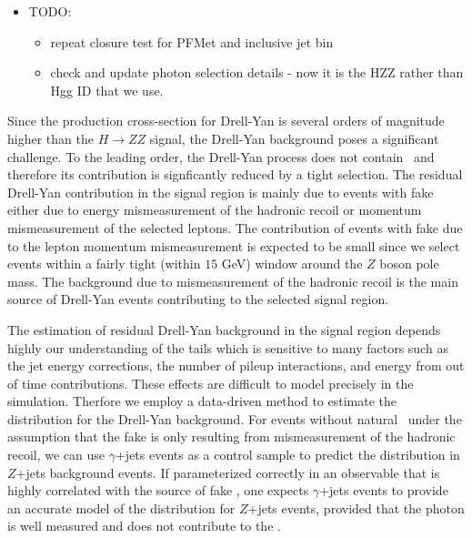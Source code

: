 
\begin{itemize}
\item TODO:
\begin{itemize}
    \item repeat closure test for PFMet and inclusive jet bin
    \item check and update photon selection details - now it is the HZZ rather than Hgg ID that we use.
\end{itemize}
\end{itemize}

Since the production cross-section for Drell-Yan is several orders of magnitude 
higher than the $H \to ZZ$ signal, the Drell-Yan background poses a significant 
challenge. To the leading order, the Drell-Yan process does not contain \met\,  
and therefore its contribution is signficantly reduced by a tight \met selection. 
The residual Drell-Yan contribution in the signal region 
is mainly due to events with fake \met either due to energy mismeasurement of  
the hadronic recoil or momentum mismeasurement of the selected leptons. 
The contribution of events with fake \met due to the lepton momentum mismeasurement 
is expected to be small since we select events within a fairly tight (within $15$ GeV) window 
around the $Z$ boson pole mass. The background due to mismeasurement of the hadronic
recoil is the main source of Drell-Yan events contributing to the selected signal region.

The estimation of residual Drell-Yan background in the signal region depends highly 
our understanding of the \met tails which is sensitive to many factors such as 
the jet energy corrections, the number of pileup interactions, and energy from out of time
contributions. These effects are difficult to model precisely in the simulation.
Therfore we employ a data-driven method to estimate the \met distribution for the 
Drell-Yan background. For events without natural \met\, under the assumption that 
the fake \met is only resulting from mismeasurement of the hadronic recoil, we can use
$\gamma$+jets events as a control sample to predict the \met distribution in $Z$+jets
background events. If parameterized correctly in an observable that is highly correlated 
with the source of fake \met, one expects $\gamma$+jets events to provide an accurate
model of the \met distribution for $Z$+jets events, provided that the photon
is well measured and does not contribute to the \met.

